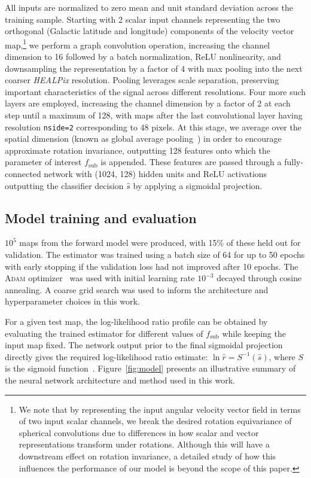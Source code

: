 \documentclass[twocolumn,linenumbers,anonymous]{aastex631}
\newcommand{\package}[1]{\textsl{#1}\xspace}
\newcommand{\healpix}{\package{HEALPix}}
\begin{document}
All inputs are normalized to zero mean and unit standard deviation across the training sample. Starting with 2 scalar input channels representing the two orthogonal (Galactic latitude and longitude) components of the velocity vector map,\footnote{We note that by representing the input angular velocity vector field in terms of two input scalar channels, we break the desired rotation equivariance of spherical convolutions due to differences in how scalar and vector representations transform under rotations. Although this will have a downstream effect on rotation invariance, a detailed study of how this influences the performance of our model is beyond the scope of this paper.} we perform a graph convolution operation, increasing the channel dimension to 16 followed by a batch normalization, ReLU nonlinearity, and downsampling the representation by a factor of 4 with max pooling into the next coarser \healpix resolution. Pooling leverages scale separation, preserving important characteristics of the signal across different resolutions. 
Four more such layers are employed, increasing the channel dimension by a factor of 2 at each step until a maximum of 128, with maps after the last convolutional layer having resolution \texttt{nside=2} corresponding to 48 pixels. At this stage, we average over the spatial dimension (known as global average pooling~\citep{lin2014network}) in order to encourage approximate rotation invariance, outputting 128 features onto which the parameter of interest $f_\mathrm{sub}$ is appended. These features are passed through a fully-connected network with (1024, 128) hidden units and ReLU activations outputting the classifier decision $\hat s$ by applying a sigmoidal projection.

\subsection{Model training and evaluation} 

$10^5$ maps from the forward model were produced, with 15\% of these held out for validation. The estimator was trained using a batch size of 64 for up to 50 epochs with early stopping if the validation loss had not improved after 10 epochs. The \textsc{Adam} optimizer~\citep{kingma2017adam} was used with initial learning rate $10^{-3}$ decayed through cosine annealing. A coarse grid search was used to inform the architecture and hyperparameter choices in this work. 

For a given test map, the log-likelihood ratio profile can be obtained by evaluating the trained estimator for different values of $f_\mathrm{sub}$ while keeping the input map fixed. The network output prior to the final sigmoidal projection directly gives the required log-likelihood ratio estimate: $\ln\hat r = S^{-1}(\hat s)$, where $S$ is the sigmoid function~\citep{Hermans:2019ioj,Hermans:2020skz}.
Figure~\ref{fig:model} presents an illustrative summary of the neural network architecture and method used in this work. \vspace{0.5cm}
\end{document}
